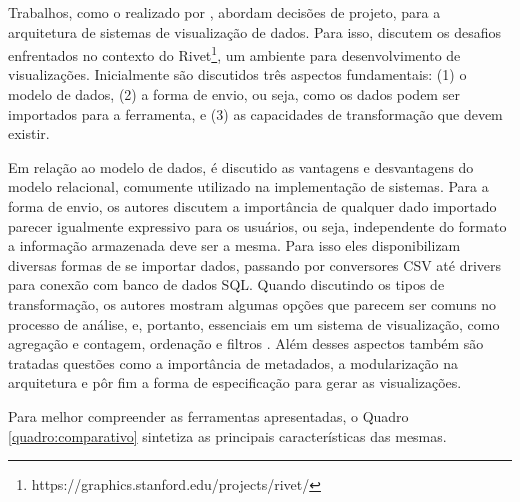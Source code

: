 Trabalhos, como o realizado por , abordam decisões de projeto, para a 
arquitetura de sistemas de visualização de dados. Para isso,  discutem 
os desafios enfrentados no contexto do Rivet\footnote{https://graphics.stanford.edu/projects/rivet/}, 
um ambiente para desenvolvimento de visualizações. Inicialmente são discutidos três aspectos 
fundamentais: (1) o modelo de dados, (2) a forma de envio, ou seja, como os dados podem ser 
importados para a ferramenta, e (3) as capacidades de transformação que devem existir. 

Em relação ao modelo de dados, é discutido as vantagens e desvantagens do modelo relacional, 
comumente utilizado na implementação de sistemas. Para a forma de envio, os autores discutem 
a importância de qualquer dado importado parecer igualmente expressivo para os usuários, ou 
seja, independente do formato a informação armazenada deve ser a mesma. Para isso eles 
disponibilizam diversas formas de se importar dados, passando por conversores CSV até 
drivers para conexão com banco de dados SQL. Quando discutindo os tipos de transformação, 
os autores mostram algumas opções que parecem ser comuns no processo de análise, e, 
portanto, essenciais em um sistema de visualização, como agregação e contagem, ordenação e 
filtros \cite{tang2004}. Além desses aspectos também são tratadas questões como a 
importância de metadados, a modularização na arquitetura e pôr fim a forma de especificação 
para gerar as visualizações.

Para melhor compreender as ferramentas apresentadas, o Quadro \ref{quadro:comparativo} sintetiza as principais 
características das mesmas.

